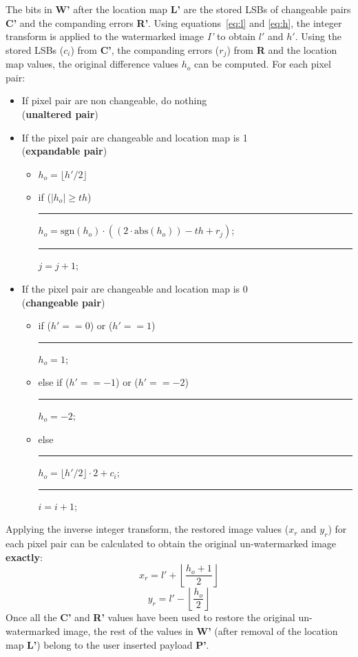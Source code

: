 \documentclass[10pt,twocolumn,letterpaper]{article}
\begin{document}
{The bits in {\bf W'} after the location map {\bf L'} are the stored LSBs of changeable pairs {\bf C'} and 
the companding errors {\bf R'}. 
Using equations~\ref{eq:l} and \ref{eq:h}, the integer transform is applied to the watermarked image \emph{I'} to obtain
$l'$ and $h'$. Using the stored LSBs ($c_{i}$) from {\bf C'}, the companding errors ($r_{j}$) from {\bf R}
and the location map values, the original difference values $h_{o}$ can be computed. For each pixel pair:
\begin{itemize}
	\item If pixel pair are non changeable, do nothing \\ ({\bf unaltered pair})
	\item If the pixel pair are changeable and location map is 1 \\ ({\bf expandable pair})
	\begin{itemize}
		\item $h_{o} = \lfloor h'/2 \rfloor$
		\item if ($|h_{o}| \geq th$) \\ \rule{0.2cm}{0cm} $h_{o} = \mbox{sgn}(h_{o}) \cdot ((2 \cdot \mbox{abs}(h_{o})) - th + r_{j})$;\\
			\rule{0.2cm}{0cm} $j=j+1$;
	\end{itemize}
	\item If the pixel pair are changeable and location map is 0 \\ ({\bf changeable pair}) 
	\begin{itemize}
		\item if ($h'==0$) or ($h'==1$) \\ \rule{0.2cm}{0cm} $h_{o}=1$;
		\item else if ($h'==-1$) or ($h'==-2$) \\ \rule{0.2cm}{0cm} $h_{o}=-2$;
		\item else \\ \rule{0.2cm}{0cm} $h_{o}= \lfloor h'/2 \rfloor \cdot 2 + c_{i}$; \\ \rule{0.2cm}{0cm} $i=i+1$;
	\end{itemize}
\end{itemize}
Applying the inverse integer transform, the restored image values ($x_{r}$ and $y_{r}$) 
for each pixel pair can be calculated
to obtain the original un-watermarked image {\bf exactly}:
\begin{equation}
x_{r} = l' + \left \lfloor \frac{h_{o}+1}{2} \right \rfloor 
\end{equation}
\begin{equation}
y_{r} = l' - \left \lfloor \frac{h_{o}}{2} \right \rfloor 
\end{equation}
Once all the {\bf C'} and {\bf R'} values have been used to restore the original un-watermarked image, the rest of the values in {\bf W'}
(after removal of the location map {\bf L'}) belong to the user inserted payload {\bf P'}.

}
\end{document}
